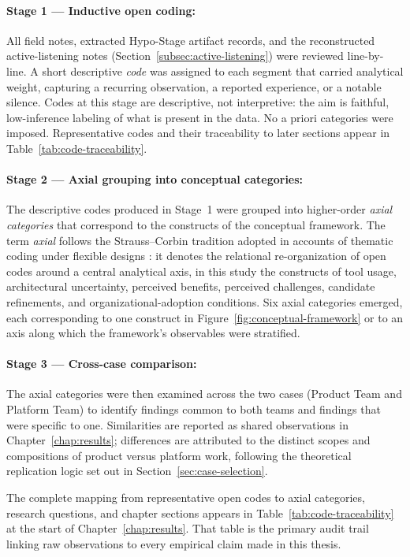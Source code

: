 \paragraph{Stage 1 --- Inductive open coding:} All field notes, extracted
Hypo-Stage artifact records, and the reconstructed active-listening notes
(Section~\ref{subsec:active-listening}) were reviewed line-by-line. A short
descriptive \emph{code} was assigned to each segment that carried
analytical weight, capturing a recurring observation, a reported experience,
or a notable silence. Codes at this stage are descriptive, not interpretive:
the aim is faithful, low-inference labeling of what is present in the data.
No a priori categories were imposed. Representative codes and their
traceability to later sections appear in Table~\ref{tab:code-traceability}.

\paragraph{Stage 2 --- Axial grouping into conceptual categories:} The
descriptive codes produced in Stage~1 were grouped into higher-order
\emph{axial categories} that correspond to the constructs of the conceptual
framework. The term \emph{axial} follows the Strauss--Corbin tradition adopted
in accounts of thematic coding under flexible designs \citep{robson2016}: it denotes the relational re-organization of open codes
around a central analytical axis, in this study the constructs of tool usage,
architectural uncertainty, perceived benefits, perceived challenges, candidate
refinements, and organizational-adoption conditions. Six axial categories
emerged, each corresponding to one construct in
Figure~\ref{fig:conceptual-framework} or to an axis along which the
framework's observables were stratified.

\paragraph{Stage 3 --- Cross-case comparison:} The axial categories were then
examined across the two cases (Product Team and Platform Team) to identify
findings common to both teams and findings that were specific to one.
Similarities are reported as shared observations in
Chapter~\ref{chap:results}; differences are attributed to the distinct scopes
and compositions of product versus platform work, following the theoretical
replication logic set out in
Section~\ref{sec:case-selection}.

The complete mapping from representative open codes to axial categories,
research questions, and chapter sections appears in
Table~\ref{tab:code-traceability} at the start of
Chapter~\ref{chap:results}. That table is the primary audit trail linking
raw observations to every empirical claim made in this thesis.

